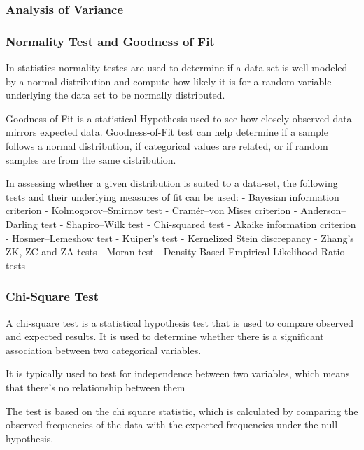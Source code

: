 \documentclass[11pt]{article}
\begin{document}
\hypertarget{analysis-of-variance}{%
\subsubsection{Analysis of Variance}\label{analysis-of-variance}}

\hypertarget{normality-test-and-goodness-of-fit}{%
\subsubsection{Normality Test and Goodness of
Fit}\label{normality-test-and-goodness-of-fit}}

In statistics normality testes are used to determine if a data set is
well-modeled by a normal distribution and compute how likely it is for a
random variable underlying the data set to be normally distributed.

Goodness of Fit is a statistical Hypothesis used to see how closely
observed data mirrors expected data. Goodness-of-Fit test can help
determine if a sample follows a normal distribution, if categorical
values are related, or if random samples are from the same distribution.

In assessing whether a given distribution is suited to a data-set, the
following tests and their underlying measures of fit can be used: -
Bayesian information criterion - Kolmogorov--Smirnov test - Cramér--von
Mises criterion - Anderson--Darling test - Shapiro--Wilk test -
Chi-squared test - Akaike information criterion - Hosmer--Lemeshow test
- Kuiper's test - Kernelized Stein discrepancy - Zhang's ZK, ZC and ZA
tests - Moran test - Density Based Empirical Likelihood Ratio tests

\hypertarget{chi-square-test}{%
\subsubsection{Chi-Square Test}\label{chi-square-test}}

A chi-square test is a statistical hypothesis test that is used to
compare observed and expected results. It is used to determine whether
there is a significant association between two categorical variables.

It is typically used to test for independence between two variables,
which means that there's no relationship between them

The test is based on the chi square statistic, which is calculated by
comparing the observed frequencies of the data with the expected
frequencies under the null hypothesis.
\end{document}
